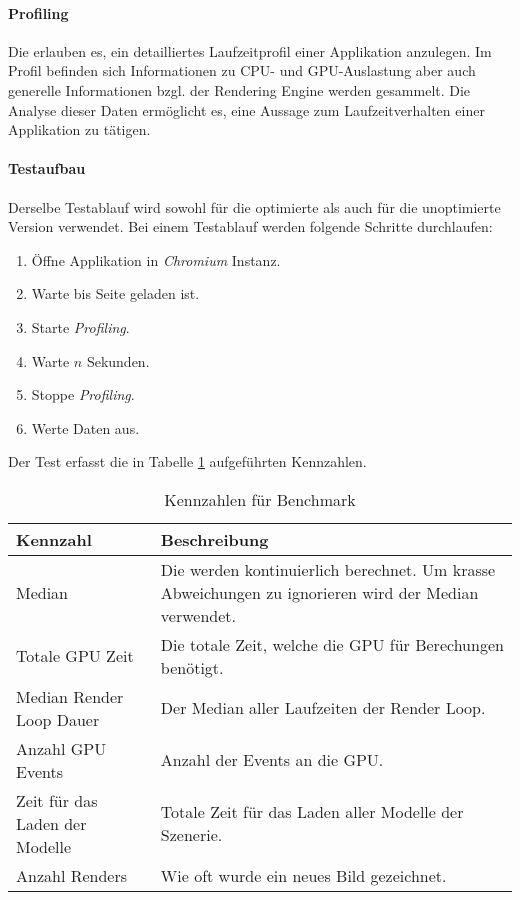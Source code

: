 \paragraph{Profiling}
Die  erlauben es, ein detailliertes Laufzeitprofil einer Applikation anzulegen.
Im Profil befinden sich Informationen zu CPU- und GPU-Auslastung aber auch generelle Informationen bzgl. der \gls{Rendering Engine} werden gesammelt.
Die Analyse dieser Daten ermöglicht es, eine Aussage zum Laufzeitverhalten einer Applikation zu tätigen.

\paragraph{Testaufbau}
Derselbe Testablauf wird sowohl für die optimierte als auch für die unoptimierte Version verwendet.
Bei einem Testablauf werden folgende Schritte durchlaufen:

\begin{enumerate}
  \item Öffne Applikation in \emph{Chromium} Instanz.
  \item Warte bis Seite geladen ist.
  \item Starte \emph{Profiling}.
  \item Warte $n$ Sekunden.
  \item Stoppe \emph{Profiling}.
  \item Werte Daten aus.
\end{enumerate}

Der Test erfasst die in Tabelle \ref{table:benchmarkFigures} aufgeführten Kennzahlen.

\begin{table}[H]
  \centering
  \begin{tabular}{ l p{8cm} }
  \hline
  Kennzahl & Beschreibung \\
  \hline
  \hline
  Median \e{\gls{FPS}} & Die \e{\gls{FPS}} werden kontinuierlich berechnet. Um krasse Abweichungen zu ignorieren wird der Median verwendet. \\
  \hline
  Totale GPU Zeit & Die totale Zeit, welche die GPU für Berechungen benötigt. \\
  \hline
  Median Render Loop Dauer & Der Median aller Laufzeiten der Render Loop. \\
  \hline
  Anzahl GPU Events & Anzahl der Events an die GPU. \\
  \hline
  Zeit für das Laden der Modelle & Totale Zeit für das Laden aller Modelle der Szenerie. \\
  \hline
  Anzahl Renders & Wie oft wurde ein neues Bild gezeichnet. \\
  \hline
  \end{tabular}
  \caption{Kennzahlen für Benchmark}
  \label{table:benchmarkFigures}
\end{table}

